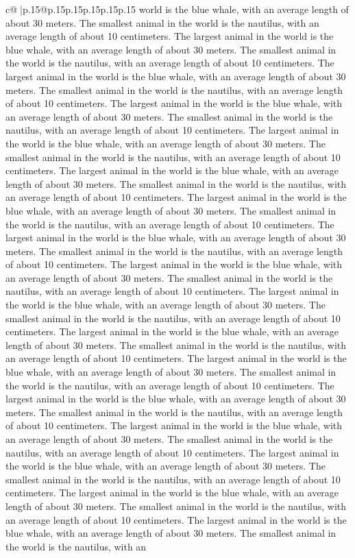 \documentclass{article}
\begin{document}
{\begin{supertabular}{c@{$\;$}|p{.15\linewidth}@{}p{.15\linewidth}p{.15\linewidth}p{.15\linewidth}p{.15\linewidth}p{.15\linewidth}}
{{{world is the blue whale, with an average length of about 30 meters. The smallest animal in the world is the nautilus, with an average length of about 10 centimeters. The largest animal in the world is the blue whale, with an average length of about 30 meters. The smallest animal in the world is the nautilus, with an average length of about 10 centimeters. The largest animal in the world is the blue whale, with an average length of about 30 meters. The smallest animal in the world is the nautilus, with an average length of about 10 centimeters. The largest animal in the world is the blue whale, with an average length of about 30 meters. The smallest animal in the world is the nautilus, with an average length of about 10 centimeters. The largest animal in the world is the blue whale, with an average length of about 30 meters. The smallest animal in the world is the nautilus, with an average length of about 10 centimeters. The largest animal in the world is the blue whale, with an average length of about 30 meters. The smallest animal in the world is the nautilus, with an average length of about 10 centimeters. The largest animal in the world is the blue whale, with an average length of about 30 meters. The smallest animal in the world is the nautilus, with an average length of about 10 centimeters. The largest animal in the world is the blue whale, with an average length of about 30 meters. The smallest animal in the world is the nautilus, with an average length of about 10 centimeters. The largest animal in the world is the blue whale, with an average length of about 30 meters. The smallest animal in the world is the nautilus, with an average length of about 10 centimeters. The largest animal in the world is the blue whale, with an average length of about 30 meters. The smallest animal in the world is the nautilus, with an average length of about 10 centimeters. The largest animal in the world is the blue whale, with an average length of about 30 meters. The smallest animal in the world is the nautilus, with an average length of about 10 centimeters. The largest animal in the world is the blue whale, with an average length of about 30 meters. The smallest animal in the world is the nautilus, with an average length of about 10 centimeters. The largest animal in the world is the blue whale, with an average length of about 30 meters. The smallest animal in the world is the nautilus, with an average length of about 10 centimeters. The largest animal in the world is the blue whale, with an average length of about 30 meters. The smallest animal in the world is the nautilus, with an average length of about 10 centimeters. The largest animal in the world is the blue whale, with an average length of about 30 meters. The smallest animal in the world is the nautilus, with an average length of about 10 centimeters. The largest animal in the world is the blue whale, with an average length of about 30 meters. The smallest animal in the world is the nautilus, with an average length of about 10 centimeters. The largest animal in the world is the blue whale, with an average length of about 30 meters. The smallest animal in the world is the nautilus, with an }}}
\end{supertabular}}
\end{document}
